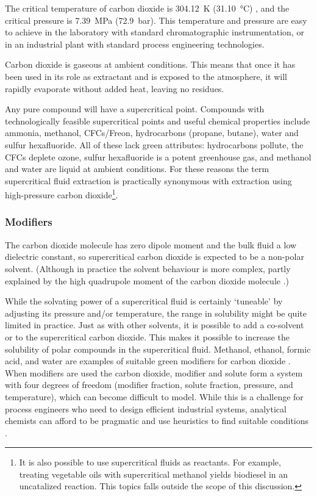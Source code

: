 The critical temperature of carbon dioxide is \SI{304.12}{\kelvin}
(\SI{31.10}{\celsius}) , and the critical pressure is \SI{7.39}{\mega\pascal}
(\SI{72.9}{\bar}). This temperature and pressure are easy to achieve in the
laboratory with standard chromatographic instrumentation, or in an industrial
plant with standard process engineering technologies.

Carbon dioxide is gaseous at ambient conditions. This means that once it has
been used in its role as extractant and is exposed to the atmosphere, it
will rapidly evaporate without added heat, leaving no residues.

Any pure compound will have a supercritical point. Compounds with
technologically feasible supercritical points and useful chemical properties
include ammonia, methanol, CFCs/Freon, hydrocarbons (propane, butane), water and
sulfur hexafluoride. All of these lack green attributes: hydrocarbons pollute,
the CFCs deplete ozone, sulfur hexafluoride is a potent greenhouse gas, and
methanol and water are liquid at ambient conditions. For these reasons the term
supercritical fluid extraction is practically synonymous with extraction using
high-pressure carbon dioxide\footnote{It is also possible to use supercritical
fluids as reactants. For example, treating vegetable oils with supercritical
methanol yields biodiesel in an uncatalized reaction.  This topics falls outside
the scope of this discussion.}.

 
\subsubsection{Modifiers}

\label{sec:modifiers}

The carbon dioxide molecule has zero dipole moment and the bulk fluid a low
dielectric constant, so supercritical carbon dioxide is expected to be
a non-polar solvent. (Although in practice the solvent behaviour is more
complex, partly explained by the high quadrupole moment of the carbon dioxide
molecule \autocite{Raveendran2005}.)

While the solvating power of a supercritical fluid is certainly `tuneable' by
adjusting its pressure and/or temperature, the range in solubility might be
quite limited in practice. Just as with other solvents, it is possible to add a
co-solvent or  to the supercritical carbon dioxide. This makes
it possible to increase the solubility of polar compounds in the supercritical
fluid. Methanol, ethanol, formic acid, and water are examples of suitable green
modifiers for carbon dioxide \autocite{Herrero2010}. When modifiers are used the
carbon dioxide, modifier and solute form a system with four degrees of freedom
(modifier fraction, solute fraction, pressure, and temperature), which
can become difficult to model. While this is a challenge for process engineers
who need to design efficient industrial systems, analytical chemists can afford
to be pragmatic and use heuristics to find suitable conditions
\autocite{Wells2003}.

